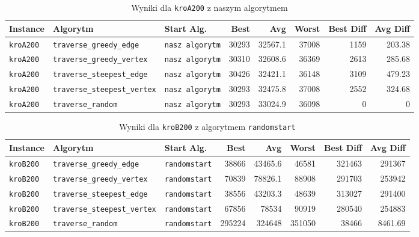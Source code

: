 \documentclass[11pt]{article}
\begin{document}
\begin{table}[ht]
\centering
\begin{tabular}{|l|l|l|r|r|r|r|r|}
\hline
\textbf{Instance} & \textbf{Algorytm} & \textbf{Start Alg.} & \textbf{Best} & \textbf{Avg} & \textbf{Worst} & \textbf{Best Diff} & \textbf{Avg Diff} \\
\hline
\texttt{kroA200} & \texttt{traverse\_greedy\_edge} & \texttt{nasz algorytm} & 30293 & 32567.1 & 37008 & 1159 & 203.38 \\
\texttt{kroA200} & \texttt{traverse\_greedy\_vertex} & \texttt{nasz algorytm} & 30310 & 32608.6 & 36369 & 2613 & 285.68 \\
\texttt{kroA200} & \texttt{traverse\_steepest\_edge} & \texttt{nasz algorytm} & 30426 & 32421.1 & 36148 & 3109 & 479.23 \\
\texttt{kroA200} & \texttt{traverse\_steepest\_vertex} & \texttt{nasz algorytm} & 30293 & 32475.8 & 37008 & 2552 & 324.68 \\
\texttt{kroA200} & \texttt{traverse\_random} & \texttt{nasz algorytm} & 30293 & 33024.9 & 36098 & 0 & 0 \\
\hline
\end{tabular}
\caption{Wyniki dla \texttt{kroA200} z naszym algorytmem}\label{tab:table2}
\end{table}

\begin{table}[ht]
\centering
\begin{tabular}{|l|l|l|r|r|r|r|r|}
\hline
\textbf{Instance} & \textbf{Algorytm} & \textbf{Start Alg.} & \textbf{Best} & \textbf{Avg} & \textbf{Worst} & \textbf{Best Diff} & \textbf{Avg Diff} \\
\hline
\texttt{kroB200} & \texttt{traverse\_greedy\_edge} & \texttt{randomstart} & 38866 & 43465.6 & 46581 & 321463 & 291367 \\
\texttt{kroB200} & \texttt{traverse\_greedy\_vertex} & \texttt{randomstart} & 70839 & 78826.1 & 88908 & 291703 & 253942 \\
\texttt{kroB200} & \texttt{traverse\_steepest\_edge} & \texttt{randomstart} & 38556 & 43203.3 & 48639 & 313027 & 291400 \\
\texttt{kroB200} & \texttt{traverse\_steepest\_vertex} & \texttt{randomstart} & 67856 & 78534 & 90919 & 280540 & 254883 \\
\texttt{kroB200} & \texttt{traverse\_random} & \texttt{randomstart} & 295224 & 324648 & 351050 & 38466 & 8461.69 \\
\hline
\end{tabular}
\caption{Wyniki dla \texttt{kroB200} z algorytmem \texttt{randomstart}}\label{tab:table3}
\end{table}
\end{document}
